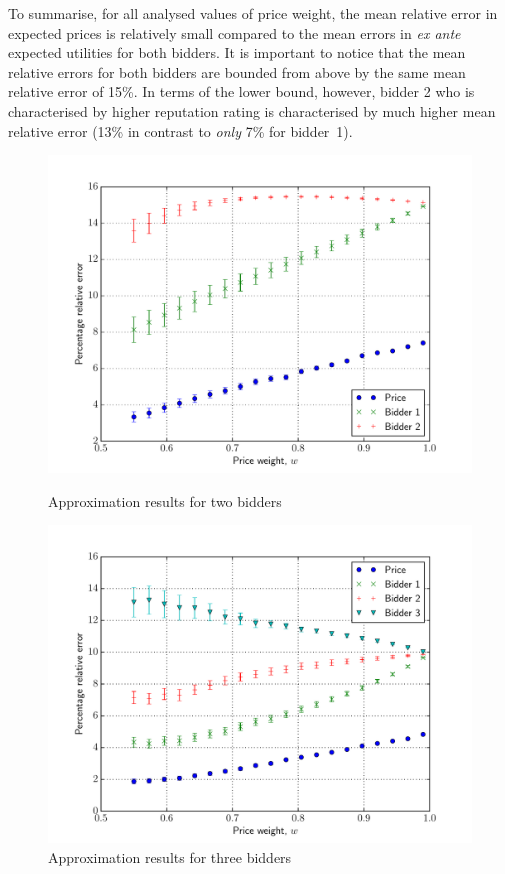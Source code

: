 To summarise, for all analysed values of price weight, the mean relative error in expected prices is relatively small compared to the mean errors in \emph{ex ante} expected utilities for both bidders. It is important to notice that the mean relative errors for both bidders are bounded from above by the same mean relative error of 15\%. In terms of the lower bound, however, bidder 2 who is characterised by higher reputation rating is characterised by much higher mean relative error (13\% in contrast to \emph{only} 7\% for bidder~1).

\begin{figure}[p!]
  \includegraphics[width=\figsize]{Approximation/Figures/compare_2_bidders}
  \caption{Approximation results for two bidders}
  \label{fig:compare_2_bidders_approximation}
  \vspace{10mm}
  \includegraphics[width=\figsize]{Approximation/Figures/compare_3_bidders}
  \caption{Approximation results for three bidders}
  \label{fig:compare_3_bidders_approximation}
\end{figure}

